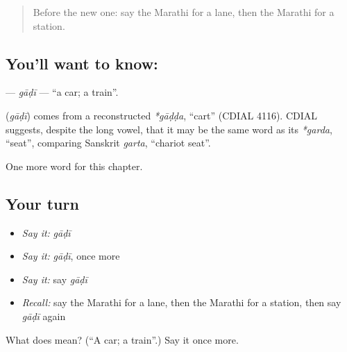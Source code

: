 \label{lesson:MR-C113-gadi}



\begin{quote}
Before the new one: say the Marathi for a lane, then the Marathi for a station.
\end{quote}

\subsection*{You'll want to know: }
\textbf{} — \emph{gāḍī} — \textquotedblleft{}a car; a train\textquotedblright{}.

\begin{cousinweb}
\textbf{} (\emph{gāḍī}) comes from a reconstructed \emph{*gāḍḍa}, \textquotedblleft{}cart\textquotedblright{} (CDIAL 4116). CDIAL suggests, despite the long vowel, that it may be the same word as its \emph{*garda}, \textquotedblleft{}seat\textquotedblright{}, comparing Sanskrit \emph{garta}, \textquotedblleft{}chariot seat\textquotedblright{}.
\end{cousinweb}

\begin{grammarlens}[title={What you've built}]
One more word for this chapter.
\end{grammarlens}

\subsection*{Your turn}
\begin{itemize}
\raggedright
  \item \emph{Say it:} \emph{gāḍī}
  \item \emph{Say it:} \emph{gāḍī}, once more
  \item \emph{Say it:} say \emph{gāḍī}
  \item \emph{Recall:} say the Marathi for a lane, then the Marathi for a station, then say \emph{gāḍī} again
\end{itemize}

\begin{tcolorbox}[breakable,colback=teal!4,colframe=teal!35!black,title={Before you move on}]
What does  mean? (\textquotedblleft{}A car; a train\textquotedblright{}.) Say it once more.
\end{tcolorbox}
